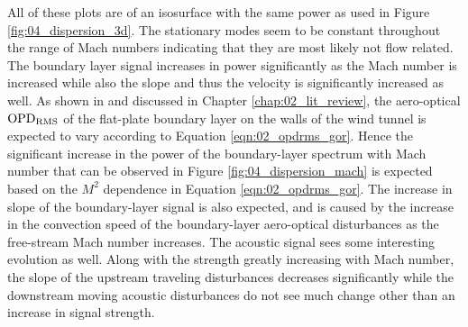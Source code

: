 All of these plots are of an isosurface with the same power as used in Figure \ref{fig:04_dispersion_3d}.
The stationary modes seem to be constant throughout the range of Mach numbers indicating that they are most likely not flow related.
The boundary layer signal increases in power significantly as the Mach number is increased while also the slope and thus the velocity is significantly increased as well.
As shown in  and discussed in Chapter \ref{chap:02_lit_review}, the aero-optical $\operatorname{OPD_{RMS}}$ of the flat-plate boundary layer on the walls of the wind tunnel is expected to vary according to Equation \ref{eqn:02_opdrms_gor}.
Hence the significant increase in the power of the boundary-layer spectrum with Mach number that can be observed in Figure \ref{fig:04_dispersion_mach} is expected based on the $M^2$ dependence in Equation \ref{eqn:02_opdrms_gor}.
The increase in slope of the boundary-layer signal is also expected, and is caused by the increase in the convection speed of the boundary-layer aero-optical disturbances as the free-stream Mach number increases.
The acoustic signal sees some interesting evolution as well.
Along with the strength greatly increasing with Mach number, the slope of the upstream traveling disturbances decreases significantly while the downstream moving acoustic disturbances do not see much change other than an increase in signal strength.

